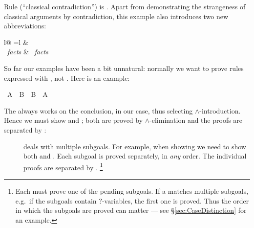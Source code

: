 \begin{isabellebody}
\isamarkupfalse%
\isamarkupfalse%
\isamarkupfalse%
\isamarkupfalse%
\isamarkupfalse%
\isamarkupfalse%
\isamarkupfalse%
\isamarkupfalse%
\isamarkupfalse%
\isamarkupfalse%
\isamarkupfalse%
\isamarkupfalse%
\isamarkupfalse%
\isamarkupfalse%
\isamarkupfalse%
\isamarkupfalse%
\isamarkupfalse%
\isamarkupfalse%
%
\begin{isamarkuptext}%
\noindent
Rule  (``classical contradiction'') is
.
Apart from demonstrating the strangeness of classical
arguments by contradiction, this example also introduces two new
abbreviations:
\begin{center}
\begin{tabular}{l@ {\quad=\quad}l}
 &   \\
~\emph{facts} &
~\emph{facts} 
\end{tabular}
\end{center}%
\end{isamarkuptext}%
\isamarkuptrue%
%
\isamarkuptrue%
%
\begin{isamarkuptext}%
So far our examples have been a bit unnatural: normally we want to
prove rules expressed with \isa{{\isasymLongrightarrow}}, not \isa{{\isasymlongrightarrow}}. Here is an example:%
\end{isamarkuptext}%
\isamarkuptrue%
\ {\isachardoublequote}A\ {\isasymand}\ B\ {\isasymLongrightarrow}\ B\ {\isasymand}\ A{\isachardoublequote}\isanewline
\isamarkupfalse%
\isamarkupfalse%
\isamarkupfalse%
\isamarkupfalse%
\isamarkupfalse%
\isamarkupfalse%
\isamarkupfalse%
\isamarkupfalse%
\isamarkupfalse%
\isamarkupfalse%
%
\begin{isamarkuptext}%
\noindent The  always works on the conclusion,
 in our case, thus selecting $\land$-introduction. Hence
we must show  and ; both are proved by
$\land$-elimination and the proofs are separated by :
\begin{description}
\item[] deals with multiple subgoals. For example,
when showing  we need to show both  and .  Each subgoal is proved separately, in \emph{any} order. The
individual proofs are separated by .  \footnote{Each
 must prove one of the pending subgoals.  If a
 matches multiple subgoals, e.g.\ if the subgoals
contain ?-variables, the first one is proved. Thus the order in which
the subgoals are proved can matter --- see
\S\ref{sec:CaseDistinction} for an example.}


\end{description}
\end{isamarkuptext}
\end{isabellebody}
